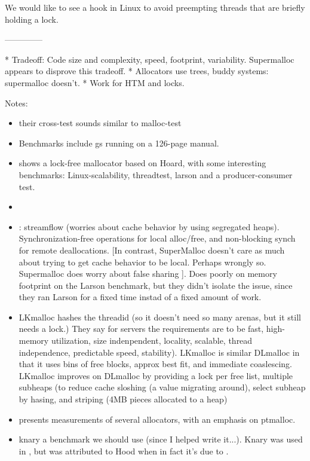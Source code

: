 \documentclass[pldi]{sigplanconf-pldi15}
\begin{document}
We would like to see a hook in Linux to avoid preempting threads that
are briefly holding a lock.

--------------

* Tradeoff: Code size and complexity, speed, footprint, variability.  Supermalloc appears to disprove this tradeoff.
* Allocators use trees, buddy systems: supermalloc doesn't.
* Work for HTM and locks.


Notes: 
\begin{itemize}
\item \cite{KukanovVo07} their cross-test sounds similar to malloc-test
\item \cite{DetlefsDoZo94} Benchmarks include gs running on a 126-page manual.
\item \cite{Michael04} shows a lock-free mallocator based on Hoard, with some interesting benchmarks: Linux-scalability, threadtest, larson and a producer-consumer test.
\item \cite{FengBe05}
\item \cite{SchneiderAnNi06}: streamflow (worries about cache behavior by using segregated heaps).  Synchronization-free operations for local alloc/free, and non-blocking synch for remote deallocations.  [In contrast, SuperMalloc doesn't care as much about trying to get cache behavior to be local.  Perhaps wrongly so.  Supermalloc does worry about false sharing  ].  Does poorly on memory footprint on the Larson benchmark, but they didn't isolate the issue, since they ran Larson for a fixed time instad of a fixed amount of work.
\item \cite{LarsonKr98} LKmalloc hashes the threadid (so it doesn't need so many arenas, but it still needs a lock.)  They say for servers the requirements are to be fast, high-memory utilization, size indenpendent, locality, scalable, thread independence, predictable speed, stability).  LKmalloc is similar DLmalloc in that it uses bins of free blocks, approx best fit, and immediate coaslescing.  LKmalloc improves on DLmalloc by providing a lock per free list, multiple subheaps (to reduce cache sloshing (a value migrating around), select subheap by hasing, and striping (4MB pieces allocated to a heap)
\item \cite{Gloger12} presents measurements of several allocators, with an emphasis on ptmalloc.
\item knary a benchmark we should use (since I helped write
  it...).  Knary was used in \cite{SchneiderAnNi06}, but was
  attributed to Hood when in fact it's due to \cite{BlumofeJoKu96}.
\end{itemize}
\end{document}
